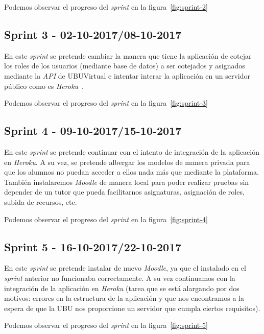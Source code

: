 Podemos observar el progreso del \textit{sprint} en la figura~\ref{fig:sprint-2}

\subsection{Sprint 3 - 02-10-2017/08-10-2017}
En este \textit{sprint} se pretende cambiar la manera que tiene la aplicación de cotejar los roles de los usuarios (mediante base de datos) a ser cotejados y asignados mediante la \textit{API} de UBUVirtual e intentar interar la aplicación en un servidor público como es \textit{Heroku}~\cite{wiki:heroku}.

Podemos observar el progreso del \textit{sprint} en la figura~\ref{fig:sprint-3}

\subsection{Sprint 4 - 09-10-2017/15-10-2017}
En este \textit{sprint} se pretende continuar con el intento de integración de la aplicación en \textit{Heroku}. A su vez, se pretende albergar los modelos de manera privada para que los alumnos no puedan acceder a ellos nada más que mediante la plataforma. También instalaremos \textit{Moodle} de manera local para poder realizar pruebas sin depender de un tutor que pueda facilitarnos asignaturas, asignación de roles, subida de recursos, etc.

Podemos observar el progreso del \textit{sprint} en la figura~\ref{fig:sprint-4}

\subsection{Sprint 5 - 16-10-2017/22-10-2017}
En este \textit{sprint} se pretende instalar de nuevo \textit{Moodle}, ya que el instalado en el \textit{sprint} anterior no funcionaba correctamente. A su vez continuamos con la integración de la aplicación en \textit{Heroku} (tarea que se está alargando por dos motivos: errores en la estructura de la aplicación y que nos encontramos a la espera de que la UBU nos proporcione un servidor que cumpla ciertos requisitos).

Podemos observar el progreso del \textit{sprint} en la figura~\ref{fig:sprint-5}


